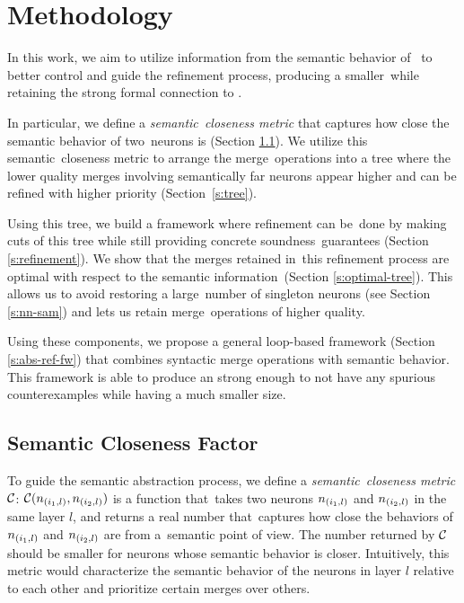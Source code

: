 \section{Methodology}

In this work, we aim to utilize information from the semantic behavior of \cnc to better control and guide the refinement process, producing a smaller \abs while retaining the strong formal connection to \cnc.




In particular, we define a \textit{semantic closeness metric} that captures how close the semantic behavior of two neurons is (Section \ref{s:semantic-closeness}). We utilize this semantic closeness metric to arrange the merge operations into a tree where the lower quality merges involving semantically far
neurons appear higher and can be refined with higher priority (Section \ref{s:tree}).




Using this tree, we build a framework where refinement can be done by making cuts of this tree while still providing concrete soundness guarantees (Section \ref{s:refinement}). We show that the merges retained in this refinement process are optimal with respect to the semantic information (Section \ref{s:optimal-tree}). This allows us to avoid restoring a large number of singleton neurons (see Section \ref{s:nn-sam}) and lets us retain merge operations of higher quality.




Using these components, we propose a general \cegar loop-based framework (Section \ref{s:abs-ref-fw}) that combines syntactic merge operations with semantic behavior. This framework is able to produce an \abs strong enough to not have any spurious counterexamples while having a much smaller size.




\subsection{Semantic Closeness Factor}
\label{s:semantic-closeness}




To guide the semantic abstraction process, we define a \emph{semantic closeness metric} $\mathcal{C}$: $\mathcal{C}(n_{(i_1,l)}, n_{(i_2,l)})$ is a function that takes two neurons $n_{(i_1,l)}$ and $n_{(i_2,l)}$ in
the same layer $l$, and returns a real number that captures how close the behaviors of $n_{(i_1,l)}$ and $n_{(i_2,l)}$ are from a semantic point of view. The number returned by $\mathcal{C}$ should be smaller for
neurons whose semantic behavior is closer. Intuitively, this metric would characterize the semantic behavior of the neurons in layer $l$ relative to each other and prioritize certain merges over others.




